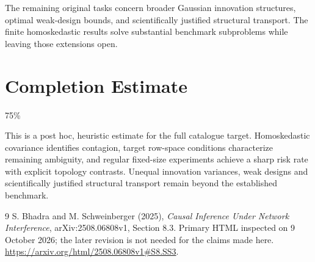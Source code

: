 \documentclass[11pt]{article}
\begin{document}
The remaining original tasks concern broader Gaussian innovation structures, optimal weak-design bounds, and scientifically justified structural transport. The finite homoskedastic results solve substantial benchmark subproblems while leaving those extensions open.

\section{Completion Estimate}
75\%

This is a post hoc, heuristic estimate for the full catalogue target.
Homoskedastic covariance identifies contagion, target row-space conditions characterize remaining ambiguity, and regular fixed-size experiments achieve a sharp risk rate with explicit topology contrasts. Unequal innovation variances, weak designs and scientifically justified structural transport remain beyond the established benchmark.

\begin{thebibliography}{9}
 S. Bhadra and M. Schweinberger (2025), \emph{Causal Inference Under Network Interference}, arXiv:2508.06808v1, Section 8.3. Primary HTML inspected on 9 October 2026; the later revision is not needed for the claims made here. \url{https://arxiv.org/html/2508.06808v1#S8.SS3}.
\end{thebibliography}
\end{document}
